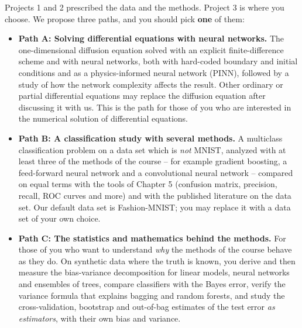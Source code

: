 \documentclass[11pt,a4paper]{article}
\begin{document}
Projects 1 and 2 prescribed the data and the methods.  Project 3 is where you
choose.  We propose three paths, and you should pick \textbf{one} of them:
\begin{itemize}[nosep,leftmargin=*]
  \item \textbf{Path A: Solving differential equations with neural networks.}
        The one-dimensional diffusion equation solved with an explicit
        finite-difference scheme and with neural networks, both with
        hard-coded boundary and initial conditions and as a physics-informed
        neural network (PINN), followed by a study of how the network
        complexity affects the result.  Other ordinary or partial differential
        equations may replace the diffusion equation after discussing it with
        us.  This is the path for those of you who are interested in the
        numerical solution of differential equations.
  \item \textbf{Path B: A classification study with several methods.}
        A multiclass classification problem on a data set which is
        \emph{not} MNIST, analyzed with at least three of the methods of the
        course -- for example gradient boosting, a feed-forward neural
        network and a convolutional neural network -- compared on equal
        terms with the tools of Chapter 5 (confusion matrix, precision,
        recall, ROC curves and more) and with the published literature on the
        data set.  Our default data set is Fashion-MNIST; you may replace it
        with a data set of your own choice.
  \item \textbf{Path C: The statistics and mathematics behind the methods.}
        For those of you who want to understand \emph{why} the methods of
        the course behave as they do.  On synthetic data where the truth is
        known, you derive and then measure the bias-variance decomposition
        for linear models, neural networks and ensembles of trees, compare
        classifiers with the Bayes error, verify the variance formula that
        explains bagging and random forests, and study the cross-validation,
        bootstrap and out-of-bag estimates of the test error \emph{as
        estimators}, with their own bias and variance.
\end{itemize}
\end{document}
